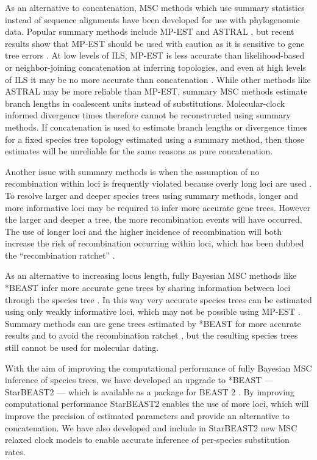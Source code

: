 \documentclass[nogrid]{MBE}%
\begin{document}
As an alternative to concatenation, MSC methods which use summary statistics
instead of sequence alignments have been developed for use with phylogenomic
data. Popular summary methods include MP-EST and ASTRAL \citep{Liu2010,
Mirarab01092014}, but recent results show that MP-EST should be used with
caution as it is sensitive to gene tree errors \citep{Mirarab15062015,
Xi201563}. At low levels of ILS, MP-EST is less accurate than likelihood-based
or neighbor-joining concatenation at inferring topologies, and even at high
levels of ILS it may be no more accurate than concatenation
\citep{Ogilvie01052016}. While other methods like ASTRAL may be more
reliable than MP-EST, summary MSC methods estimate branch lengths in coalescent
units instead of substitutions. Molecular-clock informed divergence times
therefore cannot be reconstructed using summary methods. If concatenation is
used to estimate branch lengths or divergence times for a fixed species tree
topology estimated using a summary method, then those estimates will be
unreliable for the same reasons as pure concatenation.

Another issue with summary methods is when the assumption of
no recombination within loci is frequently violated because overly long loci are used \citep{Gatesy26032013}. To
resolve larger and deeper species trees using summary methods, longer and more
informative loci may be required to infer more accurate gene trees. However
the larger and deeper a tree, the more recombination events will have occurred.
The use of longer loci and the higher incidence of recombination will both
increase the risk of recombination occurring within loci, which has been dubbed
the ``recombination ratchet'' \citep{Springer20161}.

As an alternative to increasing locus length, fully Bayesian MSC methods like
*BEAST infer more accurate gene trees by sharing information between loci
through the species tree \citep{Szollosi01012015}. In this way very accurate
species trees can be estimated using only weakly informative loci, which may
not be possible using MP-EST \citep{Xu1353}. Summary methods can use gene
trees estimated by *BEAST for more accurate results and to avoid the
recombination ratchet \citep{Zimmermann2014}, but the resulting species trees
still cannot be used for molecular dating.

With the aim of improving the computational performance of fully Bayesian MSC
inference of species trees, we have developed an upgrade to *BEAST ---
StarBEAST2 --- which is available as a package for BEAST 2
\citep{10.1371/journal.pcbi.1003537}. By improving computational performance
StarBEAST2 enables the use of more loci, which will improve the
precision of estimated parameters and provide an alternative to concatenation.
We have also developed and include in StarBEAST2 new MSC relaxed clock models
to enable accurate inference of per-species substitution rates.
\end{document}
